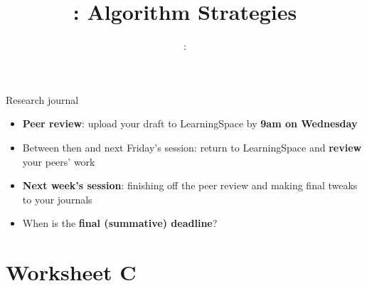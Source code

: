 \usepackage{../../beamerthemeFalmouthGamesAcademy}
\usepackage{multimedia}
\graphicspath{ {../../} }

\lstset{language=Python
}

\usepackage[normalem]{ulem}
\usepackage{wasysym}

\usepackage{algpseudocode}

\usepackage{pdfpages}

\usetikzlibrary{arrows,automata}
\usetikzlibrary{tikzmark,calc}




\title{\sessionnumber: Algorithm Strategies}
\subtitle{\modulecode: \moduletitle}

\frame{\titlepage} 



\begin{frame}{Research journal}
	\begin{itemize}
		\item \textbf{Peer review}: upload your draft to LearningSpace by \textbf{9am on Wednesday}
		\item Between then and next Friday's session: return to LearningSpace and \textbf{review} your peers' work
		\item \textbf{Next week's session}: finishing off the peer review and making final tweaks to your journals
		\item When is the \textbf{final (summative) deadline}?
	\end{itemize}
\end{frame}





\part{Worksheet C}
\frame{\partpage}


